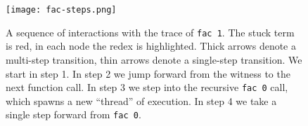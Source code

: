 
\begin{figure}[t]
\centering
\texttt{[image: fac-steps.png]}
\caption{A sequence of interactions with the trace of
  \texttt{fac 1}. The stuck term is red, in each node the redex is
  highlighted. Thick arrows denote a multi-step transition, thin arrows
  denote a single-step transition. We start in step 1. In step 2 we jump
  forward from the witness to the next function call. In step 3 we step
  into the recursive \texttt{fac 0} call, which spawns a new ``thread''
  of execution. In step 4 we take a single step forward from
  \texttt{fac 0}.}
\label{fig:nanomaly-factorial}
\end{figure}
